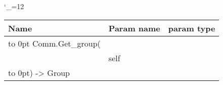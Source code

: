 \begingroup \catcode`\_=12 \tt
\begin{tabular}{lll}
\toprule
\textrm{Name}&\textrm{Param name}&\textrm{param type}\\
\midrule
\hbox to 0pt {Comm.Get_group(\hss}\\
& self\\
\hbox to 0pt{) -> Group\hss}\\
\bottomrule
\end{tabular}
\endgroup
